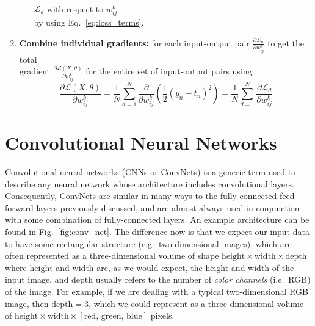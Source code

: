 \documentclass[../main.tex]{subfiles}
\begin{document}
\begin{algorithm}[htpb]
\begin{enumerate}
\begin{itemize}
            $\mathcal{L}_{d}$ with respect to $w_{ij}^{k}$ \\
            by using Eq.~\ref{eq:loss_terms}.\;
        \end{itemize}
      \item \textbf{Combine individual gradients:} for each input-output pair
        $\frac{\partial \mathcal{L}_{n}}{\partial w_{ij}^{k}}$ to get 
        the total \\
        gradient $\frac{\partial \mathcal{L}(X, \theta)}{\partial w_{ij}^{k}}$
        for the entire set of input-output pairs using:\;
        \begin{equation*}
          \frac{\partial \mathcal{L}(X, \theta)}{\partial w_{ij}^{k}} 
          = \frac{1}{N}\sum_{d=1}^{N}\frac{\partial}{\partial w_{ij}^{k}}
            {\left(\frac{1}{2}{(y_n - t_{n})}^{2}\right)} 
          = \frac{1}{N}\sum_{d=1}^{N}\frac{\partial \mathcal{L}_{d}}{\partial
            w_{ij}^{k}}
        \end{equation*}
    \end{enumerate}%
\label{alg:backprop_algorithm}
\end{algorithm}

\section{Convolutional Neural Networks}%
\label{sec:conv_nets}
Convolutional neural networks (CNNs or ConvNets) is a generic term used to
describe any neural network whose architecture includes convolutional layers. 
%
Consequently, ConvNets are similar in many ways to the fully-connected
feed-forward layers previously discussed, and are almost always used in
conjunction with some combination of fully-connected layers.
%
An example architecture can be found in Fig.~\ref{fig:conv_net}.
%
The difference now is that we expect our input data to have some rectangular
structure (e.g.\ two-dimensional images), which are often represented as a
three-dimensional volume of shape
$\mathrm{height}\times\mathrm{width}\times\mathrm{depth}$ where
$\mathrm{height}$ and $\mathrm{width}$ are, as we would expect, the height and
width of the input image, and $\mathrm{depth}$ usually refers to the number of
\emph{color channels} (i.e.\ RGB) of the image.
%
For example, if we are dealing with a typical two-dimensional RGB image, then
$\mathrm{depth} = 3$, which we could represent as a three-dimensional volume of
$\mathrm{height}\times\mathrm{width}\times[\mathrm{red}, \,\mathrm{green},\,
\mathrm{blue}]$ pixels.
\end{document}
